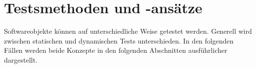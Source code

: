 \section{Testsmethoden und -ansätze}

Softwareobjekte können auf unterschiedliche Weise
getestet werden. Generell wird zwischen statischen und
dynamischen Tests unterschieden. In den folgenden
Fällen werden beide Konzepte in den folgenden
Abschnitten ausführlicher dargestellt.




